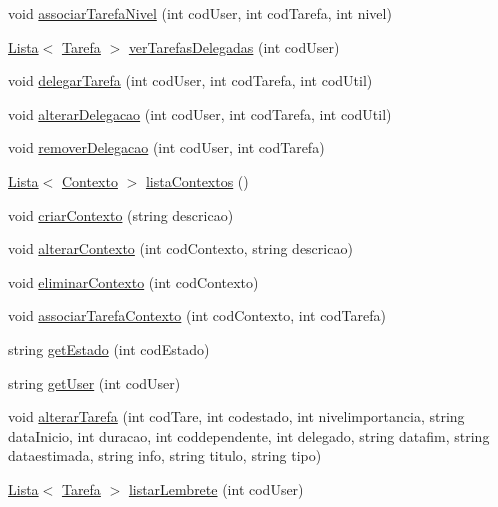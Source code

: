 \begin{DoxyCompactItemize}
\item 
void \hyperlink{class_b_dados_a5e98953aca7656eb6dfff56bdd0ac3f5}{associar\-Tarefa\-Nivel} (int cod\-User, int cod\-Tarefa, int nivel)
\item 
\hyperlink{class_lista}{Lista}$<$ \hyperlink{class_tarefa}{Tarefa} $>$ \hyperlink{class_b_dados_a1a1983a52b1d0aee1a786e3d2297fd2b}{ver\-Tarefas\-Delegadas} (int cod\-User)
\item 
void \hyperlink{class_b_dados_a1f328f854e55375ba11c35bdba713b9d}{delegar\-Tarefa} (int cod\-User, int cod\-Tarefa, int cod\-Util)
\item 
void \hyperlink{class_b_dados_ab6b3eb3191c70887fa0ad2d47b0ef1db}{alterar\-Delegacao} (int cod\-User, int cod\-Tarefa, int cod\-Util)
\item 
void \hyperlink{class_b_dados_a436ea9d9faf6c87ce9a333450de17489}{remover\-Delegacao} (int cod\-User, int cod\-Tarefa)
\item 
\hyperlink{class_lista}{Lista}$<$ \hyperlink{class_contexto}{Contexto} $>$ \hyperlink{class_b_dados_adf75e2b436691359a54accd76fc64572}{lista\-Contextos} ()
\item 
void \hyperlink{class_b_dados_a11d1bb24bda2f99a8c19e003716615d9}{criar\-Contexto} (string descricao)
\item 
void \hyperlink{class_b_dados_a7a96c0045ef58bdd4908571fd39d60b4}{alterar\-Contexto} (int cod\-Contexto, string descricao)
\item 
void \hyperlink{class_b_dados_ad4b08c40697c9e59382b885c059dca0d}{eliminar\-Contexto} (int cod\-Contexto)
\item 
void \hyperlink{class_b_dados_a8512f98b95d54b46ea18ed2e18566e48}{associar\-Tarefa\-Contexto} (int cod\-Contexto, int cod\-Tarefa)
\item 
string \hyperlink{class_b_dados_a6667289022bc6f206b627d32b5f2056e}{get\-Estado} (int cod\-Estado)
\item 
string \hyperlink{class_b_dados_a88d695c4eb090b5a7b92ff0111dfb595}{get\-User} (int cod\-User)
\item 
void \hyperlink{class_b_dados_a72d5d77314f543e34ba2ed8e2331802e}{alterar\-Tarefa} (int cod\-Tare, int codestado, int nivelimportancia, string data\-Inicio, int duracao, int coddependente, int delegado, string datafim, string dataestimada, string info, string titulo, string tipo)
\item 
\hyperlink{class_lista}{Lista}$<$ \hyperlink{class_tarefa}{Tarefa} $>$ \hyperlink{class_b_dados_ae4702b62a0ffea33c81e61bb2f473ce1}{listar\-Lembrete} (int cod\-User)
\item 

\end{DoxyCompactItemize}
